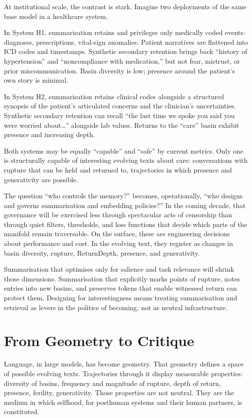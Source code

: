 \documentclass[12pt,a4paper]{article}
\begin{document}
At institutional scale, the contrast is stark. Imagine two deployments of the same base model in a healthcare system.

In System H1, summarisation retains and privileges only medically coded events: diagnoses, prescriptions, vital-sign anomalies. Patient narratives are flattened into ICD codes and timestamps. Synthetic secondary retention brings back ``history of hypertension'' and ``noncompliance with medication,'' but not fear, mistrust, or prior miscommunication. Basin diversity is low; presence around the patient's own story is minimal.

In System H2, summarisation retains clinical codes alongside a structured synopsis of the patient's articulated concerns and the clinician's uncertainties. Synthetic secondary retention can recall ``the last time we spoke you said you were worried about\ldots'' alongside lab values. Returns to the ``care'' basin exhibit presence and increasing depth.

Both systems may be equally ``capable'' and ``safe'' by current metrics. Only one is structurally capable of interesting evolving texts about care: conversations with rupture that can be held and returned to, trajectories in which presence and generativity are possible.

The question ``who controls the memory?'' becomes, operationally, ``who designs and governs summarisation and embedding policies?'' In the coming decade, that governance will be exercised less through spectacular acts of censorship than through quiet filters, thresholds, and loss functions that decide which parts of the manifold remain traversable. On the surface, these are engineering decisions about performance and cost. In the evolving text, they register as changes in basin diversity, rupture, ReturnDepth, presence, and generativity.

Summarisation that optimises only for salience and task relevance will shrink those dimensions. Summarisation that explicitly marks points of rupture, notes entries into new basins, and preserves tokens that enable witnessed return can protect them. Designing for interestingness means treating summarisation and retrieval as levers in the politics of becoming, not as neutral infrastructure.


\section{From Geometry to Critique}

Language, in large models, has become geometry. That geometry defines a space of possible evolving texts. Trajectories through it display measurable properties: diversity of basins, frequency and magnitude of rupture, depth of return, presence, ferility, generativity. Those properties are not neutral. They are the medium in which selfhood, for posthuman systems and their human partners, is constituted.
\end{document}

